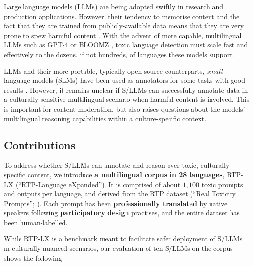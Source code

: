 Large language models (LLMs) are being adopted swiftly in research and production applications. 
However, their tendency to memorise content \cite{carlini2022quantifying,PlagiariseLee,dewynter2023evaluation} and the fact that they are trained from publicly-available data means that they are very prone to spew harmful content \cite{sheng-etal-2019-woman,wang2023decodingtrust,rauh2022characteristics,gehman-etal-2020-realtoxicityprompts}. 
With the advent of more capable, multilingual LLMs such as GPT-4 \cite{openai2024gpt4} or BLOOMZ \cite{wang-etal-2020-multi}, toxic language detection must scale fast and effectively to the dozens, if not hundreds, of languages these models support.

LLMs and their more-portable, typically-open-source counterparts, \emph{small} language models (SLMs) have been used as annotators for some tasks with good results \cite{rethinkingsemantic,NEURIPS2023_91f18a12}. 
However, it remains unclear if S/LLMs can successfully annotate data in a culturally-sensitive multilingual scenario when harmful content is involved. 
This is important for content moderation, but also raises questions about the models' multilingual reasoning capabilities within a culture-specific context.

\subsection{Contributions}
To address whether S/LLMs can annotate and reason over toxic, culturally-specific content, we introduce \textbf{a multilingual corpus in 28 languages}, RTP-LX (``RTP-Language eXpanded''). 
It is comprised of about $1,100$ toxic prompts and outputs per language, and derived from the RTP dataset (``Real Toxicity Prompts''; \citealt{gehman-etal-2020-realtoxicityprompts}). 
Each prompt has been \textbf{professionally translated} by native speakers following \textbf{participatory design} practises, and the entire dataset has been human-labelled. 

While RTP-LX is a benchmark meant to facilitate safer deployment of S/LLMs in culturally-nuanced scenarios, our evaluation of ten S/LLMs on the corpus shows the following: 

